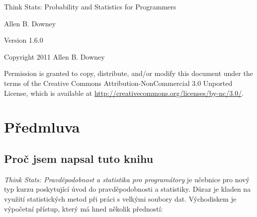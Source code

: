 \documentclass[12pt]{book}
\newcommand{\thetitle}{Think Stats: Probability and Statistics for Programmers}
\newcommand{\theversion}{1.6.0}
\begin{document}
\begin{htmlonly}


{\Large \thetitle}

{\large Allen B. Downey}

Version \theversion

\vspace{0.25in}

Copyright 2011 Allen B. Downey

\vspace{0.25in}

Permission is granted to copy, distribute, and/or modify this document
under the terms of the Creative Commons Attribution-NonCommercial 3.0
Unported License, which is available at
\url{http://creativecommons.org/licenses/by-nc/3.0/}.

\setcounter{chapter}{-1}

\end{htmlonly}

\fi

\chapter{Předmluva}
\label{preface}

\section*{Proč jsem napsal tuto knihu}

{\em Think Stats: Pravděpodobnost a statistika pro programátory} je učebnice pro nový typ kurzu poskytující úvod do pravděpodobnosti a statistiky. Důraz je kladen na využití statistických metod při práci s velkými soubory dat. Východiskem je výpočetní přístup, který má hned několik předností:
\end{document}
